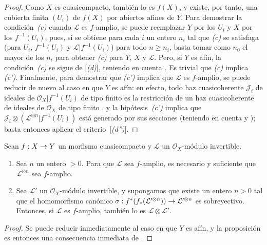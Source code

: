 \documentclass[oneside,10pt]{amsart}
\makeatletter
\renewcommand{\geq}{\geqslant}
\newcommand{\ega@arrow}[2]{\mathchoice{#1}{#2}{#2}{#2}}
\renewcommand{\to}{\ega@arrow{\longrightarrow}{\rightarrow}}
\newcommand{\oldpage}[2][]{\marginnote{\normalfont\footnotesize\textbf{#1}~|~#2}\ignorespaces}
\let\EGAOriginalLabel\label
\renewcommand{\label}[1]{\phantomsection\EGAOriginalLabel{#1}}
\makeatother
\begin{document}
\begin{proof}
Como $X$ es cuasicompacto, también lo es $f(X)$, y existe, por tanto, una cubierta finita $(U_i)$ de $f(X)$ por abiertos afines de $Y$.
Para demostrar la condición~\emph{(c)} cuando $\mathcal{L}$ es $f$-amplio, se puede reemplazar $Y$ por los $U_i$ y $X$ por los $f^{-1}(U_i)$, pues, si se obtiene para cada $i$ un entero $n_i$ tal que \emph{(c)} se satisfaga (para $U_i$, $f^{-1}(U_i)$ y $\mathcal{L}|f^{-1}(U_i)$) para todo $n\geq n_i$, basta tomar como $n_0$ el mayor de los $n_i$ para obtener \emph{(c)} para $Y$, $X$ y $\mathcal{L}$.
Pero, si $Y$ es afín, la condición~\emph{(c)} se sigue de [\emph{(d)}], teniendo en cuenta .
Es trivial que \emph{(c)} implica \emph{(c')}.
Finalmente, para demostrar que \emph{(c')} implica que $\mathcal{L}$ es $f$-amplio, se puede reducir de nuevo al caso en que $Y$ es afín:
en efecto, todo haz cuasicoherente $\mathcal{J}_i$ de ideales de $\mathcal{O}_X|f^{-1}(U_i)$ de tipo finito es la restricción de un haz cuasicoherente de ideales de $\mathcal{O}_X$ de tipo finito , y la hipótesis~\emph{(c')} implica que
\oldpage[II]{91}
$\mathcal{J}_i\otimes(\mathcal{L}^{\otimes n}|f^{-1}(U_i))$ está generado por sus secciones (teniendo en cuenta  y );
basta entonces aplicar el criterio~[\emph{(d'')}].
\end{proof}

\begin{proposition}[4.6.9]
\label{II.4.6.9-fr}
Sean $f:X\to Y$ un morfismo cuasicompacto y $\mathcal{L}$ un $\mathcal{O}_X$-módulo invertible.
\begin{enumerate}
  \item[\rm{(i)}] Sea $n$ un entero $>0$.
    Para que $\mathcal{L}$ sea $f$-amplio, es necesario y suficiente que $\mathcal{L}^{\otimes n}$ sea $f$-amplio.
  \item[\rm{(ii)}] Sea $\mathcal{L}'$ un $\mathcal{O}_X$-módulo invertible, y supongamos que existe un entero $n>0$ tal que el homomorfismo canónico $\sigma:f^*(f_*(\mathcal{L}'^{\otimes n}))\to
  \mathcal{L}'^{\otimes n}$ es sobreyectivo.
    Entonces, si $\mathcal{L}$ es $f$-amplio, también lo es $\mathcal{L}\otimes\mathcal{L}'$.
\end{enumerate}
\end{proposition}

\begin{proof}
Se puede reducir inmediatamente al caso en que $Y$ es afín, y la proposición es entonces una consecuencia inmediata de .
\end{proof}
\end{document}
